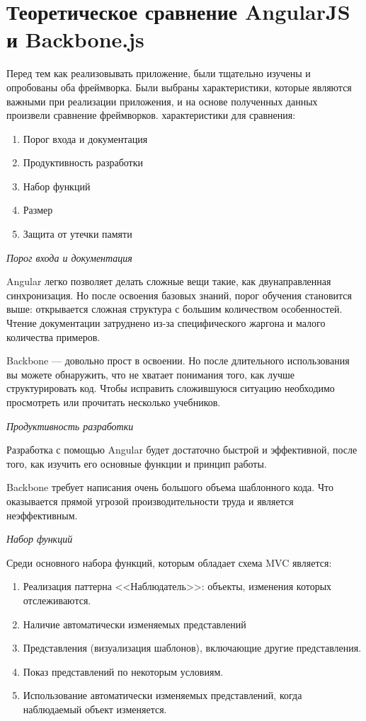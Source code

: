 \begin{enumerate}
\end{enumerate}

\section {Теоретическое сравнение AngularJS и Backbone.js}

Перед тем как реализовывать приложение, были тщательно изучены и опробованы оба фреймворка. Были выбраны характеристики, которые являются важными при реализации приложения, и на основе полученных данных произвели сравнение фреймворков. характеристики для сравнения:
\begin {enumerate}
\item Порог входа и документация
\item Продуктивность разработки
\item Набор функций
\item Размер 
\item Защита от утечки памяти 
\end {enumerate}

{\itshape Порог входа и документация}

Angular легко позволяет делать сложные вещи такие, как двунаправленная синхронизация. Но после освоения базовых знаний, порог обучения становится выше: открывается сложная структура с большим количеством особенностей. Чтение документации затруднено из-за специфического жаргона и малого количества примеров.

Backbone — довольно прост в освоении. Но после длительного использования вы можете обнаружить, что не хватает понимания того, как лучше структурировать код. Чтобы исправить сложившуюся ситуацию необходимо просмотреть или прочитать несколько учебников. 

{\itshape Продуктивность разработки}

Разработка с помощью Angular будет достаточно быстрой и эффективной, после того, как изучить его основные функции и принцип работы.

Backbone требует написания очень большого объема шаблонного кода. Что оказывается прямой угрозой производительности труда и является неэффективным.

{\itshape Набор функций}

Среди основного набора функций, которым обладает схема MVC является:
\begin{enumerate}
\item Реализация паттерна <<Наблюдатель>>: объекты, изменения которых отслеживаются.
\item  Наличие автоматически изменяемых представлений
\item Представления (визуализация шаблонов), включающие другие представления.
\item Показ представлений по некоторым условиям.
\item Использование автоматически изменяемых представлений, когда наблюдаемый объект изменяется.
\end{enumerate}

